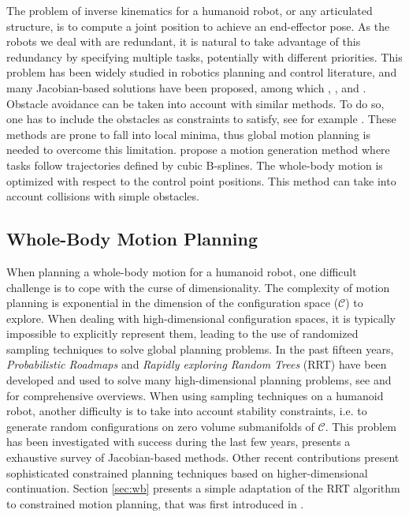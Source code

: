 \documentclass{article}
\begin{document}
The problem of inverse kinematics for a humanoid robot, or any articulated
structure, is to compute a joint position to achieve an end-effector pose. As the
robots we deal with are redundant, it is natural to take advantage of
this redundancy by specifying multiple tasks, potentially with
different priorities. This problem has been widely studied in robotics
planning and control literature, and many Jacobian-based solutions have been
proposed, among which 
\cite{nakamura1986iks}, \cite{siciliano1991gfm},
\cite{baerlocher1998tpf} and \cite{khatib2004wbd}.
Obstacle avoidance can be taken into account with similar methods. To
do so, one has to include the obstacles as  constraints to
satisfy, see for example \cite{kanehiro2008lca}.
These methods are prone to fall into local minima, thus global motion
planning is needed to overcome this limitation.
\cite{TouGieGoe2007} propose a motion generation method where tasks follow
trajectories defined by cubic B-splines. The whole-body motion is optimized
with respect to the control point positions. This method can take into account
collisions with simple obstacles.

\subsection{Whole-Body Motion Planning}

When  planning a  whole-body motion  for a  humanoid robot, one difficult
challenge is to cope with  the curse of dimensionality. The complexity
of   motion  planning  is   exponential  in   the  dimension   of  the
configuration  space ($\mathcal{C}$)  to explore.  When  dealing with
high-dimensional configuration  spaces, it is  typically impossible to
explicitly represent  them, leading to the use  of randomized sampling
techniques  to solve  global planning  problems. In  the  past fifteen
years,  \textit{Probabilistic Roadmaps} \cite{kavraki1996prp} and  
\textit{Rapidly exploring Random  Trees} (RRT) 
\cite{kuffner00rrtconnect}  have been  developed and  used to  solve many
high-dimensional   planning  problems, see \cite{Lav06} and \cite{choset2005prm} for comprehensive
overviews.
When  using  sampling  techniques  on  a humanoid  robot,  another difficulty
is to  take into  account stability  constraints,  i.e. to
generate  random  configurations   on  zero  volume  submanifolds  of
$\mathcal{C}$. This problem has been investigated with success during
the last few years, \cite{Berenson15032011} presents a exhaustive survey
of Jacobian-based methods. Other recent contributions \cite{porta2012randomized}
present sophisticated constrained planning techniques based on higher-dimensional
continuation. Section \ref{sec:wb} presents a simple adaptation
of the RRT algorithm to constrained motion planning, that was first
introduced in \cite{dalibard09}.
\end{document}
